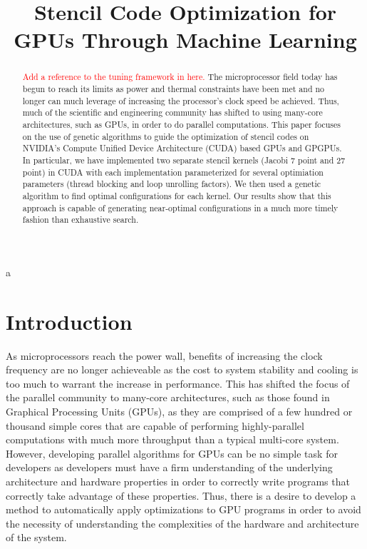 \documentclass[conference]{IEEEtran}
\newcommand {\todo}[1] {\textcolor{red}{#1}}
\begin{document}


\title{Stencil Code Optimization for GPUs Through Machine Learning}
\author{
}
\maketitle

\begin{abstract}
	\todo{Add a reference to the tuning framework in here.}
	The microprocessor field today has begun to reach its limits as power and thermal constraints have been met and no longer can much leverage of increasing the processor's clock speed be achieved. Thus, much of the scientific and engineering community has shifted to using many-core architectures, such as GPUs, in order to do parallel computations. This paper focuses on the use of genetic algorithms to guide the optimization of stencil codes on NVIDIA's Compute Unified Device Architecture (CUDA) based GPUs and GPGPUs. In particular, we have implemented two separate stencil kernels (Jacobi 7 point and 27 point) in CUDA with each implementation parameterized for several optimiation parameters (thread blocking and loop unrolling factors). We then used a genetic algorithm\cite{DEAP} to find optimal configurations for each kernel. Our results show that this approach is capable of generating near-optimal configurations in a much more timely fashion than exhaustive search.

\end{abstract}

a
\section{Introduction}
	As microprocessors reach the power wall, benefits of increasing the clock frequency are no longer achieveable as the cost to system stability and cooling is too much to warrant the increase in performance\cite{landscape}. This has shifted the focus of the parallel community to many-core architectures, such as those found in Graphical Processing Units (GPUs), as they are comprised of a few hundred or thousand simple cores that are capable of performing highly-parallel computations with much more throughput than a typical multi-core system. However, developing parallel algorithms for GPUs can be no simple task for developers as developers must have a firm understanding of the underlying architecture and hardware properties in order to correctly write programs that correctly take advantage of these properties. Thus, there is a desire to develop a method to automatically apply optimizations to GPU programs in order to avoid the necessity of understanding the complexities of the hardware and architecture of the system.
\end{document}
